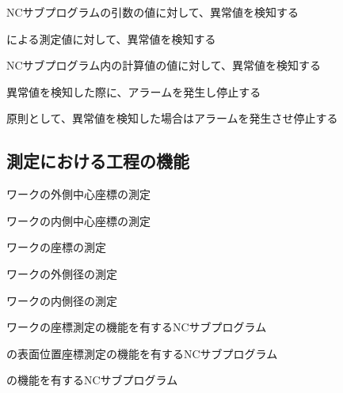 \begin{enumerate}[label*={\sarrow[red]}]
\item NCサブプログラムの引数の値に対して、異常値を検知する
\item \TouchSensorProbe による測定値に対して、異常値を検知する
\item NCサブプログラム内の計算値の値に対して、異常値を検知する
\item 異常値を検知した際に、アラームを発生し停止する
\item 原則として、異常値を検知した場合はアラームを発生させ停止する
\end{enumerate}



\clearpage


\subsection{測定における工程の機能}
\begin{enumerate}[label={\sarrow[red]}]
\item ワークの\EndFace 外側中心座標の測定
\item ワークの\EndFace 内側中心座標の測定
\item ワークの\OutcutCenter 座標の測定
\item ワークの\EndFace 外側径の測定
\item ワークの\EndFace 内側径の測定
\item ワークの\OutcutCenter 座標測定の機能を有するNCサブプログラム
\item \Dimple の表面位置座標測定の機能を有するNCサブプログラム
\item \CenterlineEndFaceDifMeasurement の機能を有するNCサブプログラム
\end{enumerate}


